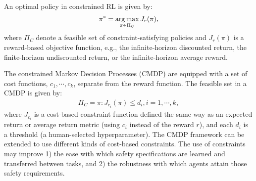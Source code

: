 An optimal policy in constrained RL is given by:
\begin{align}
\pi^* = \operatorname*{arg\,max}_{\pi \in \Pi_C} J_r(\pi),
\end{align}
where $\Pi_C$ denote a feasible set of constraint-satisfying policies and $J_r(\pi)$ is a reward-based objective function, e.g., the infinite-horizon discounted return, the finite-horizon undiscounted return, or the infinite-horizon average reward.

The constrained Markov Decision Processes (CMDP) are equipped with a set of cost functions, $c_1, \cdots, c_k$, separate from the reward function. The feasible set in a CMDP is given by:
\begin{align}
\Pi_C = {\pi:J_{c_i}(\pi) \leq d_i, i = 1, \cdots, k},
\end{align}
where $J_{c_i}$ is a cost-based constraint function defined the same way as an expected return or average return metric (using $c_i$ instead of the reward $r$), and each $d_i$ is a threshold (a human-selected hyperparameter). The CMDP framework can be extended to use different kinds of cost-based constraints. The use of constraints may improve 1) the ease with which safety specifications are learned and transferred between tasks, and 2) the robustness with which agents attain those safety requirements.

%
